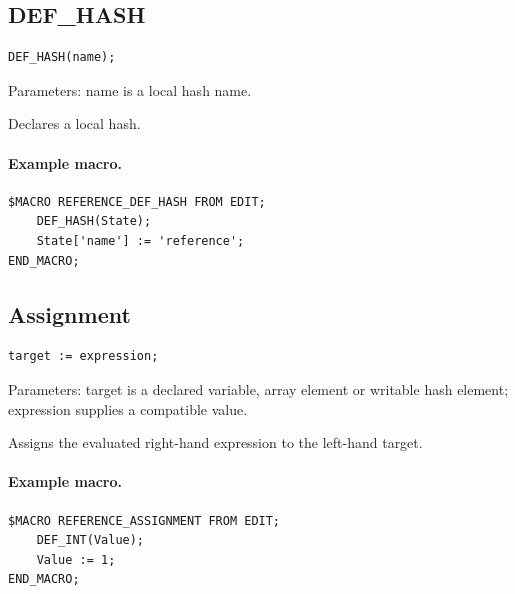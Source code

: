 \documentclass[a4paper,10pt,twoside,openany]{book}
\newenvironment{mrmacextension}{\begin{changebar}}{\end{changebar}}
\begin{document}
\begin{mrmacextension}
\label{prim:keyword-def-hash}
\subsection*{DEF\_HASH}
\begin{verbatim}
DEF_HASH(name);
\end{verbatim}
Parameters: name is a local hash name.

Declares a local hash.

\paragraph{Example macro.}
\begin{verbatim}
$MACRO REFERENCE_DEF_HASH FROM EDIT;
    DEF_HASH(State);
    State['name'] := 'reference';
END_MACRO;
\end{verbatim}
\end{mrmacextension}

\begin{mrmacextension}
\label{prim:form-assignment}
\subsection*{Assignment}
\begin{verbatim}
target := expression;
\end{verbatim}
Parameters: target is a declared variable, array element or writable hash element; expression supplies a compatible value.

Assigns the evaluated right-hand expression to the left-hand target.

\paragraph{Example macro.}
\begin{verbatim}
$MACRO REFERENCE_ASSIGNMENT FROM EDIT;
    DEF_INT(Value);
    Value := 1;
END_MACRO;
\end{verbatim}
\end{mrmacextension}
\end{document}
